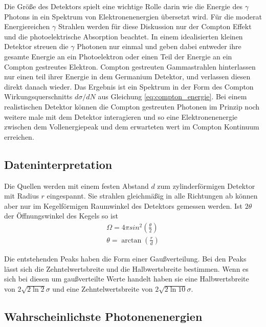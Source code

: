 Die Größe des Detektors spielt eine wichtige Rolle darin wie die Energie des
$\gamma$ Photons in ein Spektrum von Elektronenenergien übersetzt wird. Für die
moderat Energiereichen $\gamma$ Strahlen werden für diese Diskussion nur der
Compton Effekt und die photoelektrische Absorption beachtet. In einem
idealisierten kleinen Detektor streuen die $\gamma$ Photonen nur einmal und
geben dabei entweder ihre gesamte Energie an ein Photoelektron oder einen Teil
der Energie an ein Compton gestreutes Elektron. Compton gestreuten
Gammastrahlen hinterlassen nur einen teil ihrer Energie in dem Germanium
Detektor, und verlassen diesen direkt danach wieder. Das Ergebnis ist ein
Spektrum in der Form des Compton Wirkungsquerschnitts $d\sigma/dN$ aus
Gleichung \eqref{eq:compton_energie}. Bei einem realistischen Detektor können
die Compton gestreuten Photonen im Prinzip noch weitere male mit dem Detektor
interagieren und so eine Elektronenenergie zwischen dem Vollenergiepeak und dem
erwarteten wert im Compton Kontinuum erreichen.


\subsection{Dateninterpretation}
Die Quellen werden mit einem festen Abstand $d$ zum zylinderförmigen Detektor mit Radius $r$  eingespannt.
Sie strahlen gleichmäßig in alle Richtungen ab können aber nur im Kegelförmigen Raumwinkel des Detektors gemessen werden.
Ist $2\theta$ der Öffnungswinkel des Kegels so ist \cite{wiki:raum}
\begin{align}
	\Omega = 4 \pi sin^2\left(\frac{\theta}{2}\right) \\
	\theta = \arctan \left(\frac{r}{d} \right)
\end{align}\label{eq:raumwinkel}

Die entstehenden Peaks haben die Form einer Gaußverteilung.
Bei den Peaks lässt sich die Zehntelwertsbreite und die Halbwertsbreite bestimmen.
Wenn es sich bei diesen um gaußverteilte Werte handelt haben sie eine Halbwertsbreite von $2\sqrt{2\ln 2} \sigma$
und eine Zehntelwertsbreite von $2 \sqrt{2\ln 10}\sigma$.




\subsection{Wahrscheinlichste Photonenenergien}

